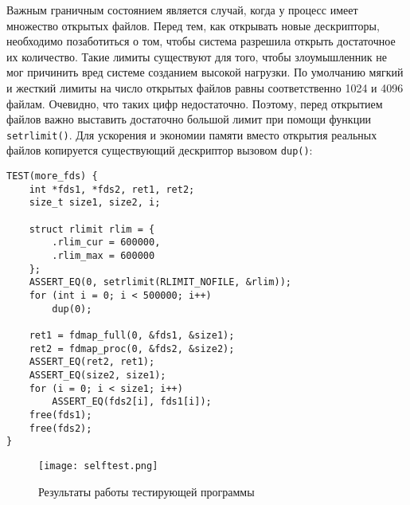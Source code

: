 Важным граничным состоянием является случай, когда у процесс имеет множество
открытых файлов. Перед тем, как открывать новые дескрипторы, необходимо
позаботиться о том, чтобы система разрешила открыть достаточное их количество.
Такие лимиты существуют для того, чтобы злоумышленник не мог причинить
вред системе созданием высокой нагрузки. По умолчанию мягкий и жесткий лимиты на
число открытых файлов равны соответственно 1024 и 4096 файлам. Очевидно, что
таких цифр недостаточно. Поэтому, перед открытием файлов важно выставить
достаточно большой лимит при помощи функции \texttt{setrlimit()}. Для ускорения
и экономии памяти вместо открытия реальных файлов копируется существующий
дескриптор вызовом \texttt{dup()}:
\medskip
\begin{lstlisting}[style=cstyle]
TEST(more_fds) {
	int *fds1, *fds2, ret1, ret2;
	size_t size1, size2, i;

	struct rlimit rlim = {
		.rlim_cur = 600000,
		.rlim_max = 600000
	};
	ASSERT_EQ(0, setrlimit(RLIMIT_NOFILE, &rlim));
	for (int i = 0; i < 500000; i++)
		dup(0);

	ret1 = fdmap_full(0, &fds1, &size1);
	ret2 = fdmap_proc(0, &fds2, &size2);
	ASSERT_EQ(ret2, ret1);
	ASSERT_EQ(size2, size1);
	for (i = 0; i < size1; i++)
		ASSERT_EQ(fds2[i], fds1[i]);
	free(fds1);
	free(fds2);
}
\end{lstlisting}
\medskip

\begin{figure}
  \centering
  \texttt{[image: selftest.png]}
  \caption{Результаты работы тестирующей программы}
  \label{fig:selftest}
\end{figure}

